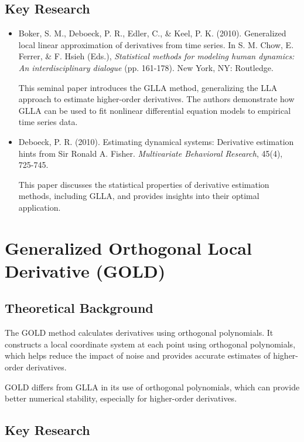 \documentclass{article}
\begin{document}
\subsection{Key Research}

\begin{itemize}
    \item Boker, S. M., Deboeck, P. R., Edler, C., \& Keel, P. K. (2010). Generalized local linear approximation of derivatives from time series. In S. M. Chow, E. Ferrer, \& F. Hsieh (Eds.), \textit{Statistical methods for modeling human dynamics: An interdisciplinary dialogue} (pp. 161-178). New York, NY: Routledge.
    
    This seminal paper introduces the GLLA method, generalizing the LLA approach to estimate higher-order derivatives. The authors demonstrate how GLLA can be used to fit nonlinear differential equation models to empirical time series data.
    
    \item Deboeck, P. R. (2010). Estimating dynamical systems: Derivative estimation hints from Sir Ronald A. Fisher. \textit{Multivariate Behavioral Research}, 45(4), 725-745.
    
    This paper discusses the statistical properties of derivative estimation methods, including GLLA, and provides insights into their optimal application.
\end{itemize}

\section{Generalized Orthogonal Local Derivative (GOLD)}

\subsection{Theoretical Background}

The GOLD method calculates derivatives using orthogonal polynomials. It constructs a local coordinate system at each point using orthogonal polynomials, which helps reduce the impact of noise and provides accurate estimates of higher-order derivatives.

GOLD differs from GLLA in its use of orthogonal polynomials, which can provide better numerical stability, especially for higher-order derivatives.

\subsection{Key Research}
\end{document}
